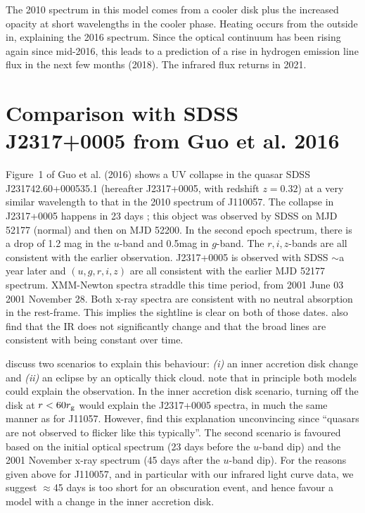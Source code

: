 \documentclass[11pt,a4paper]{article}
\begin{document}
The 2010 spectrum in this model comes from a cooler disk plus the
increased opacity at short wavelengths in the cooler phase. Heating
occurs from the outside in, explaining the 2016 spectrum.  Since the
optical continuum has been rising again since mid-2016, this leads to
a prediction of a rise in hydrogen emission line flux in the next few
months (2018). The infrared flux returns in 2021. 



\section*{Comparison with SDSS J2317+0005 from Guo et al. 2016}
Figure~1 of Guo et al. (2016) shows a UV collapse in the quasar SDSS
J231742.60+000535.1 (hereafter J2317+0005, with redshift $z=0.32$) at
a very similar wavelength to that in the 2010 spectrum of J110057. The
collapse in J2317+0005 happens in 23 days \citep[Figure 2 of
][]{Guo2016}; this object was observed by SDSS on MJD 52177 (normal)
and then on MJD 52200. In the second epoch spectrum, there is a drop
of 1.2 mag in the $u$-band and 0.5mag in $g$-band. The $r,i,z$-bands
are all consistent with the earlier observation. J2317+0005 is
observed with SDSS $\sim$a year later and $(u,g,r,i,z)$ are all
consistent with the earlier MJD 52177 spectrum. XMM-Newton spectra
straddle this time period, from 2001 June 03 2001 November 28. Both
x-ray spectra are consistent with no neutral absorption in the
rest-frame. This implies the sightline is clear on both of those
dates.  \citet{Guo2016} also find that the IR does not significantly
change and that the broad lines are consistent with being constant
over time.

\citet{Guo2016} discuss two scenarios to explain this behaviour: {\it
(i)} an inner accretion disk change and {\it (ii)} an eclipse by an
optically thick cloud. \citet{Guo2016} note that in principle both
models could explain the observation. In the inner accretion disk
scenario, turning off the disk at $r < 60 r_{\rm g}$ would explain the
J2317+0005 spectra, in much the same manner as for J11057. However,
\citet{Guo2016} find this explanation unconvincing since ``quasars are
not observed to flicker like this typically''.  The second scenario is
favoured based on the initial optical spectrum (23 days before the
$u$-band dip) and the 2001 November x-ray spectrum (45 days after the
$u$-band dip).  For the reasons given above for J110057, and in
particular with our infrared light curve data, we suggest $\approx$45
days is too short for an obscuration event, and hence favour a model
with a change in the inner accretion disk.




\end{document}
